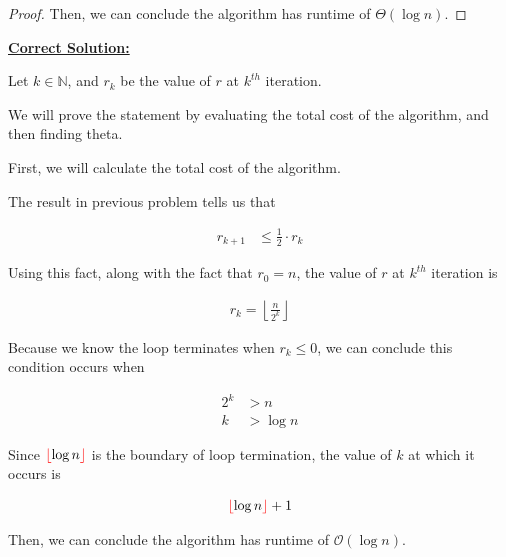 \documentclass[12pt]{article}
\begin{document}
\begin{enumerate}[a.]
\begin{proof}
        \bigskip

        Then, we can conclude the algorithm has runtime of $\Theta(\log n)$.

    \end{proof}

    \bigskip

    \begin{mdframed}
        \underline{\textbf{Correct Solution:}}

        \bigskip

        Let $k \in \mathbb{N}$, and $r_k$ be the value of $r$ at $k^{th}$ iteration.

        \bigskip

        We will prove the statement by evaluating the total cost of the algorithm, and
        then finding theta.

        \bigskip

        First, we will calculate the total cost of the algorithm.

        \bigskip

        The result in previous problem tells us that

        \setcounter{equation}{0}
        \begin{align}
            r_{k+1} &\leq \frac{1}{2} \cdot r_k
        \end{align}

        \bigskip

        Using this fact, along with the fact that $r_0 = n$, the value of $r$ at $k^{th}$ iteration is

        \begin{align}
            r_k = \left\lfloor \frac{n}{2^k} \right\rfloor
        \end{align}

        \bigskip

        Because we know the loop terminates when $r_k \leq 0$, we can conclude this
        condition occurs when

        \begin{align}
            2^k &> n\\
            k &> \log n
        \end{align}

        \bigskip

        Since $\color{red}\lfloor\color{black} \log n \color{red}\rfloor\color{black}$ is the boundary of loop termination, the value of $k$
        at which it occurs is

        \begin{align}
            \color{red}\lfloor\color{black} \log n \color{red}\rfloor\color{black} + 1
        \end{align}

        \bigskip

        Then, we can conclude the algorithm has runtime of \color{red}$\mathcal{O}(\log n)$\color{black}.

    \end{mdframed}

\end{enumerate}
\end{document}
